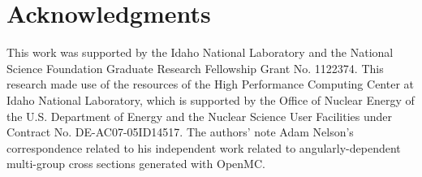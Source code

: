 \section*{Acknowledgments}


This work was supported by the Idaho National Laboratory and the National Science Foundation Graduate Research Fellowship Grant No. 1122374. This research made use of the resources of the High Performance Computing Center at Idaho National Laboratory, which is supported by the Office of Nuclear Energy of the U.S. Department of Energy and the Nuclear Science User Facilities under Contract No. DE-AC07-05ID14517. The authors' note Adam Nelson's correspondence related to his independent work related to angularly-dependent multi-group cross sections generated with OpenMC.
